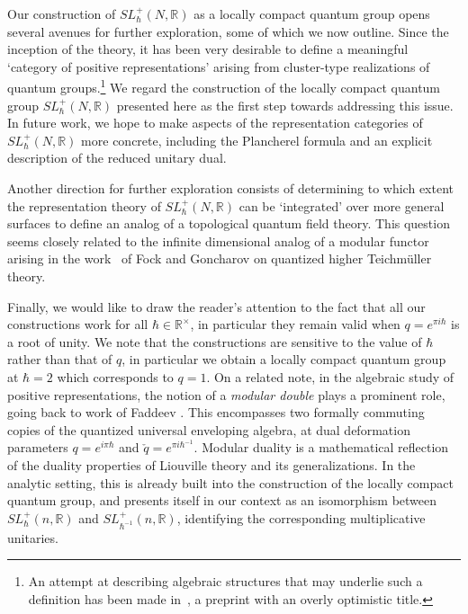 \documentclass[11pt, reqno]{amsart}
\theoremstyle{definition}
\numberwithin{equation}{section}
\def\R{\mathbb R}
\begin{document}
Our construction of $SL^+_\hbar(N,\mathbb{R})$ as a locally compact quantum group  opens several avenues for further exploration, some of which we now outline. 
Since the inception of the theory, it has been very desirable to define a meaningful `category of positive representations' arising from cluster-type realizations of quantum groups.\footnote{An attempt at describing algebraic structures that may underlie such a definition has been made in~\cite{SS17}, a preprint with an overly optimistic title.}
We regard the construction of the locally compact quantum group $SL^+_\hbar(N,\mathbb{R})$ presented here as the first step towards addressing this issue. In future work, we hope to make aspects of the representation categories of $SL^+_\hbar(N,\mathbb{R})$ more concrete, including the Plancherel formula and an explicit description of the reduced unitary dual.  

Another direction for further exploration consists of determining to which extent the representation theory of $SL^+_\hbar(N,\mathbb{R})$ can be `integrated' over more general surfaces \cite{BZBJ18} to define an analog of a topological quantum field theory. This question seems closely related to the infinite dimensional analog of a modular functor arising in the work~\cite{FG09} of Fock and Goncharov on quantized higher Teichm\"uller theory.  

Finally, we would like to draw the reader's attention to the fact that all our constructions work for all $\hbar \in \R^\times$, in particular they remain valid when $q = e^{\pi i\hbar}$ is a root of unity. We note that the constructions are sensitive to the value of $\hbar$ rather than that of $q$, in particular we obtain a locally compact quantum group at $\hbar=2$ which corresponds to $q=1$. On a related note, in the algebraic study of positive representations, the notion of a \emph{modular double} plays a prominent role, going back to work of Faddeev \cite{Fad95}. This encompasses two formally commuting copies of the quantized universal enveloping algebra, at dual deformation parameters $ q = e^{i \pi \hbar} $ and $ \check{q} = e^{\pi i \hbar^{-1}} $. Modular duality is a mathematical reflection of the duality properties of Liouville theory and its generalizations. In the analytic setting, this is already built into the construction of the locally compact quantum group, and presents itself in our context as an isomorphism between $ SL^+_\hbar(n, \mathbb{R}) $ and $ SL^+_{\hbar^{-1}}(n, \mathbb{R})$, identifying the corresponding multiplicative unitaries. 
\end{document}
